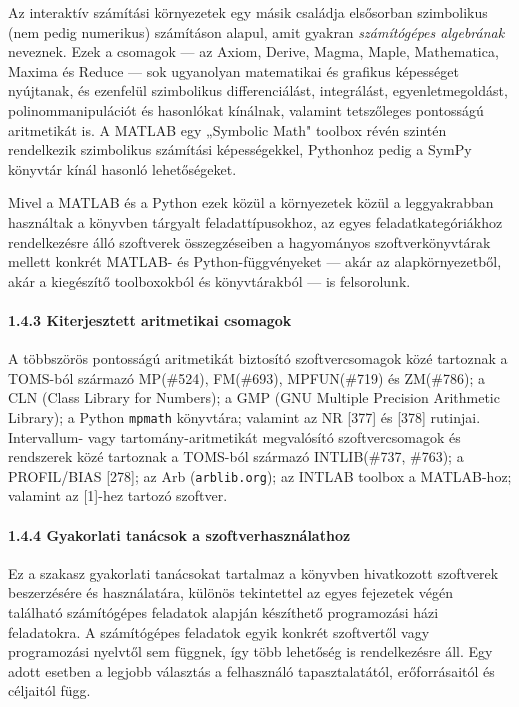 \documentclass[
  magyar,
  11pt]{article}
\begin{document}
Az interaktív számítási környezetek egy másik családja elsősorban
szimbolikus (nem pedig numerikus) számításon alapul, amit gyakran
\emph{számítógépes algebrának} neveznek. Ezek a csomagok --- az Axiom,
Derive, Magma, Maple, Mathematica, Maxima és Reduce --- sok ugyanolyan
matematikai és grafikus képességet nyújtanak, és ezenfelül szimbolikus
differenciálást, integrálást, egyenletmegoldást, polinommanipulációt és
hasonlókat kínálnak, valamint tetszőleges pontosságú aritmetikát is. A
MATLAB egy „Symbolic Math" toolbox révén szintén rendelkezik szimbolikus
számítási képességekkel, Pythonhoz pedig a SymPy könyvtár kínál hasonló
lehetőségeket.

Mivel a MATLAB és a Python ezek közül a környezetek közül a
leggyakrabban használtak a könyvben tárgyalt feladattípusokhoz, az egyes
feladatkategóriákhoz rendelkezésre álló szoftverek összegzéseiben a
hagyományos szoftverkönyvtárak mellett konkrét MATLAB- és
Python-függvényeket --- akár az alapkörnyezetből, akár a kiegészítő
toolboxokból és könyvtárakból --- is felsorolunk.

\paragraph{1.4.3 Kiterjesztett aritmetikai
csomagok}\label{kiterjesztett-aritmetikai-csomagok}

A többszörös pontosságú aritmetikát biztosító szoftvercsomagok közé
tartoznak a TOMS-ból származó MP(\#524), FM(\#693), MPFUN(\#719) és
ZM(\#786); a CLN (Class Library for Numbers); a GMP (GNU Multiple
Precision Arithmetic Library); a Python \texttt{mpmath} könyvtára;
valamint az NR {[}377{]} és {[}378{]} rutinjai. Intervallum- vagy
tartomány-aritmetikát megvalósító szoftvercsomagok és rendszerek közé
tartoznak a TOMS-ból származó INTLIB(\#737, \#763); a PROFIL/BIAS
{[}278{]}; az Arb (\texttt{arblib.org}); az INTLAB toolbox a MATLAB-hoz;
valamint az {[}1{]}-hez tartozó szoftver.

\paragraph{1.4.4 Gyakorlati tanácsok a
szoftverhasználathoz}\label{gyakorlati-tanuxe1csok-a-szoftverhasznuxe1lathoz}

Ez a szakasz gyakorlati tanácsokat tartalmaz a könyvben hivatkozott
szoftverek beszerzésére és használatára, különös tekintettel az egyes
fejezetek végén található számítógépes feladatok alapján készíthető
programozási házi feladatokra. A számítógépes feladatok egyik konkrét
szoftvertől vagy programozási nyelvtől sem függnek, így több lehetőség
is rendelkezésre áll. Egy adott esetben a legjobb választás a
felhasználó tapasztalatától, erőforrásaitól és céljaitól függ.
\end{document}
